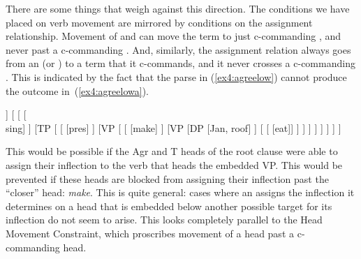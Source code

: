 There are some things that weigh against this direction. The conditions we have placed on verb movement are mirrored by conditions on the assignment relationship. Movement of  and  can move the term to just c-commanding , and never past a c-commanding . And, similarly, the assignment relation always goes from an  (or ) to a term that it c-commands, and it never crosses a c-commanding . This is indicated by the fact that the parse in (\ref{ex4:agreelow}) cannot produce the outcome in~(\ref{ex4:agreelowa}).
\begin{exe}
\ex \label{ex4:agreelow}
\small
\begin{forest}
[AgrP
	[DP [Tanja, roof]]
	[ 
		[ [\\ sing] ]
		[TP [
			[ [pres] ]
			[VP [
				[ [make] ]
				[VP
					[DP [Jan, roof] ]
					[ [ [eat]] ]
				 ]
			] ]
		] ]
	]
]
\end{forest}
\end{exe}
This would be possible if the Agr and T heads of the root clause were able to assign their inflection to the verb that heads the embedded VP. This would be prevented if these heads are blocked from assigning their inflection past the ``closer'' head: \emph{make}. This is quite general: cases where an  assigns the inflection it determines on a head that is embedded below another possible target for its inflection do not seem to arise. This looks completely parallel to the Head Movement Constraint, which proscribes movement of a head past a c-commanding head.

